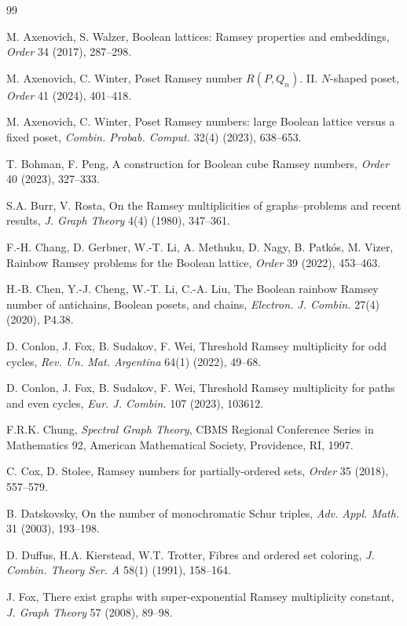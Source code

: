 \documentclass[twoside,12pt]{article}
\begin{document}
\begin{thebibliography}{99}

M. Axenovich, S. Walzer, Boolean lattices: Ramsey properties and embeddings, \emph{Order} 34 (2017), 287--298.

M. Axenovich, C. Winter, Poset Ramsey number $R(P,Q_n)$. II. $N$-shaped poset, \emph{Order} 41 (2024), 401--418.

M. Axenovich, C. Winter, Poset Ramsey numbers: large Boolean lattice versus a fixed poset, \emph{Combin. Probab. Comput.} 32(4) (2023), 638--653.

T. Bohman, F. Peng, A construction for Boolean cube Ramsey numbers, \emph{Order} 40 (2023), 327--333.

S.A. Burr, V. Rosta, On the Ramsey multiplicities of graphs--problems and recent results, \emph{J. Graph Theory} 4(4) (1980), 347--361.

F.-H. Chang, D. Gerbner, W.-T. Li, A. Methuku, D. Nagy, B. Patk\'os, M. Vizer, Rainbow Ramsey problems for the Boolean lattice, \emph{Order} 39 (2022), 453--463.

H.-B. Chen, Y.-J. Cheng, W.-T. Li, C.-A. Liu, The Boolean rainbow Ramsey number of antichains, Boolean posets, and chains, \emph{Electron. J. Combin.} 27(4) (2020), P4.38.

D. Conlon, J. Fox, B. Sudakov, F. Wei, Threshold Ramsey multiplicity for odd cycles, \emph{Rev. Un. Mat. Argentina} 64(1) (2022), 49--68.

D. Conlon, J. Fox, B. Sudakov, F. Wei, Threshold Ramsey multiplicity for paths and even cycles, \emph{Eur. J. Combin.} 107 (2023), 103612.

F.R.K. Chung, \emph{Spectral Graph Theory}, CBMS Regional Conference Series in Mathematics 92, American Mathematical Society, Providence, RI, 1997.

C. Cox, D. Stolee, Ramsey numbers for partially-ordered sets, \emph{Order} 35 (2018), 557--579.

B. Datskovsky, On the number of monochromatic Schur triples, \emph{Adv. Appl. Math.} 31 (2003), 193--198.

D. Duffus, H.A. Kierstead, W.T. Trotter, Fibres and ordered set coloring, \emph{J. Combin. Theory Ser. A} 58(1) (1991), 158--164.


J. Fox, There exist graphs with super-exponential Ramsey multiplicity constant, \emph{J. Graph Theory} 57 (2008), 89--98.


\end{thebibliography}
\end{document}
